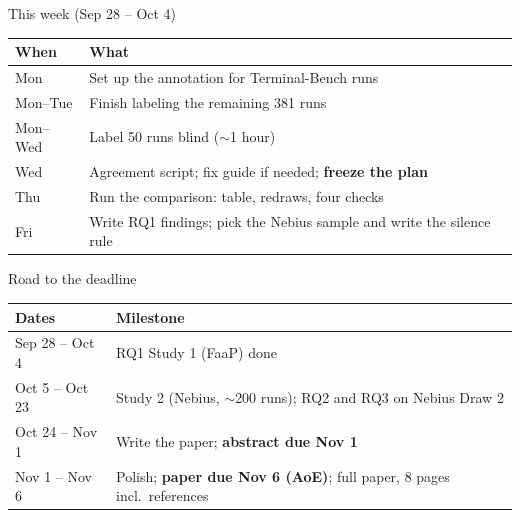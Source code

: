 \documentclass[aspectratio=169,11pt]{beamer}
\begin{document}
\begin{frame}{This week (Sep 28 -- Oct 4)}
  \small
  \begin{tabularx}{\textwidth}{@{}llL@{}}
    \toprule
    \textbf{When} & \textbf{What} \\
    \midrule
    Mon & Set up the annotation for Terminal-Bench runs \\
    Mon--Tue & Finish labeling the remaining 381 runs \\
    Mon--Wed & Label 50 runs blind ($\sim$1 hour) \\
    Wed &  Agreement script; fix guide if needed; \textbf{freeze the plan} \\
    Thu & Run the comparison: table, redraws, four checks \\
    Fri & Write RQ1 findings; pick the Nebius sample and write the silence rule \\
    \bottomrule
  \end{tabularx}
\end{frame}

\begin{frame}{Road to the deadline}
  \small
  \begin{tabularx}{\textwidth}{@{}lL@{}}
    \toprule
    \textbf{Dates} & \textbf{Milestone} \\
    \midrule
    Sep 28 -- Oct 4 & RQ1 Study 1 (FaaP) done \\
    Oct 5 -- Oct 23 & Study 2 (Nebius, $\sim$200 runs); RQ2 and RQ3 on Nebius Draw 2 \\
    Oct 24 -- Nov 1 & Write the paper; \textbf{abstract due Nov 1} \\
    Nov 1 -- Nov 6 & Polish; \textbf{paper due Nov 6 (AoE)}; full paper, 8 pages incl.\ references \\
    \bottomrule
  \end{tabularx}
\end{frame}
\end{document}
